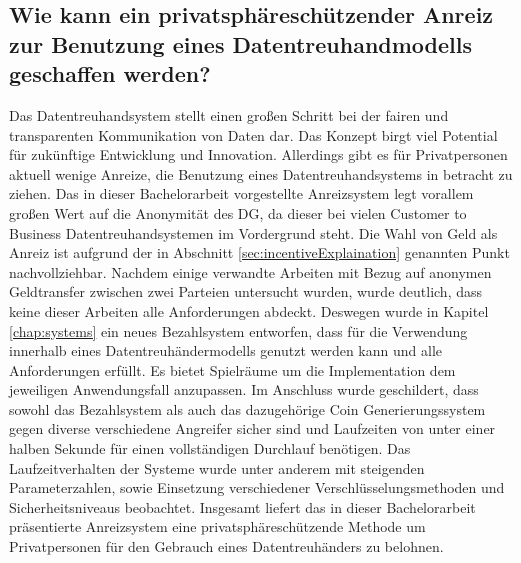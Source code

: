 \documentclass[
	fontsize=11pt,
	headings=small,
	parskip=half,           %
	bibliography=totoc,
	numbers=noenddot,       %
	open=any,               %
]{scrreprt}
\begin{document}
\subsection{Wie kann ein privatsphäreschützender Anreiz zur Benutzung eines Datentreuhandmodells geschaffen werden?}
Das Datentreuhandsystem stellt einen großen Schritt bei der fairen und transparenten Kommunikation von Daten dar. Das Konzept birgt viel Potential für zukünftige Entwicklung und Innovation. Allerdings gibt es für Privatpersonen aktuell wenige Anreize, die Benutzung eines Datentreuhandsystems in betracht zu ziehen. Das in dieser Bachelorarbeit vorgestellte Anreizsystem legt vorallem großen Wert auf die Anonymität des DG, da dieser bei vielen Customer to Business Datentreuhandsystemen im Vordergrund steht. Die Wahl von Geld als Anreiz ist aufgrund der in Abschnitt \ref{sec:incentiveExplaination} genannten Punkt nachvollziehbar. Nachdem einige verwandte Arbeiten mit Bezug auf anonymen Geldtransfer zwischen zwei Parteien untersucht wurden, wurde deutlich, dass keine dieser Arbeiten alle Anforderungen abdeckt. Deswegen wurde in Kapitel \ref{chap:systems} ein neues Bezahlsystem entworfen, dass für die Verwendung innerhalb eines Datentreuhändermodells genutzt werden kann und alle Anforderungen erfüllt. Es bietet Spielräume um die Implementation dem jeweiligen Anwendungsfall anzupassen. Im Anschluss wurde geschildert, dass sowohl das Bezahlsystem als auch das dazugehörige Coin Generierungssystem gegen diverse verschiedene Angreifer sicher sind und Laufzeiten von unter einer halben Sekunde für einen vollständigen Durchlauf benötigen. Das Laufzeitverhalten der Systeme wurde unter anderem mit steigenden Parameterzahlen, sowie Einsetzung verschiedener Verschlüsselungsmethoden und Sicherheitsniveaus beobachtet. Insgesamt liefert das in dieser Bachelorarbeit präsentierte Anreizsystem eine privatsphäreschützende Methode um Privatpersonen für den Gebrauch eines Datentreuhänders zu belohnen.
\end{document}
